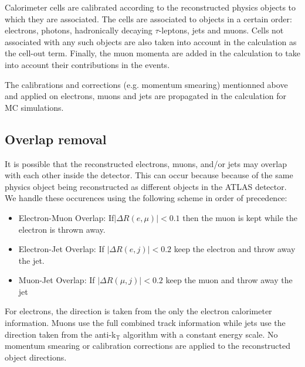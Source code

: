 Calorimeter cells are calibrated according to the reconstructed physics
objects to which they are associated. The cells are associated to
objects in a certain order: electrons, photons, hadronically decaying
$\tau$-leptons, jets and muons. Cells not associated with any such
objects are also taken into account in the \MET calculation as the cell-out term.
Finally, the muon momenta are added in the \MET{} calculation to take into account their contributions in the events.

The calibrations and corrections (e.g. momentum smearing) mentionned above and applied on electrons, muons and jets are propagated in the \MET{} calculation for MC simulations.


\subsection{Overlap removal}

It is possible that the reconstructed electrons, muons, and/or jets
may overlap with each other inside the detector.  This can occur
because because of the same physics object being reconstructed as different
objects in the ATLAS detector.  We handle these occurences using the following
scheme in order of precedence:
\begin{itemize}
	\item Electron-Muon Overlap: If$|\Delta R(e,\mu)| < 0.1$ then the  muon is kept while the electron is thrown away.
	\item Electron-Jet Overlap: If $|\Delta R(e,j)| < 0.2$ keep the electron and throw away the jet.
	\item Muon-Jet Overlap: If $|\Delta R(\mu,j)| < 0.2$ keep the muon and throw away the jet
\end{itemize}
For electrons, the direction is taken from the only the electron calorimeter
information.  Muons use the full combined track information while jets
use the direction taken from the anti-k$_{\mathrm{T}}$  algorithm with
a constant energy scale. No momentum smearing or calibration corrections
are applied to the reconstructed object directions. 

